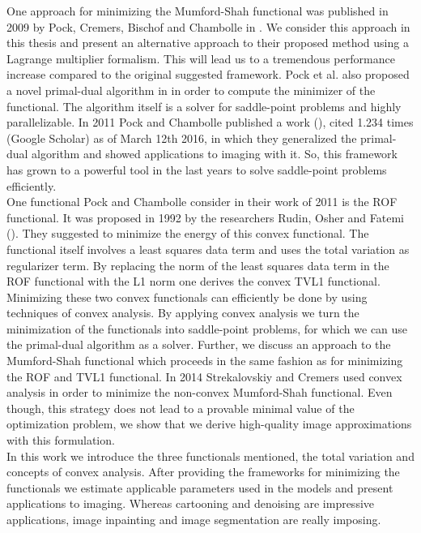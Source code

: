 \documentclass[abstracton]{scrreprt}
\begin{document}
    One approach for minimizing the Mumford-Shah functional was published in 2009 by Pock, Cremers, Bischof and Chambolle in \cite{Pock-et-al-iccv09}. We consider this approach in this thesis and present an alternative approach to their proposed method using a Lagrange multiplier formalism. This will lead us to a tremendous performance increase compared to the original suggested framework. Pock et al. also proposed a novel primal-dual algorithm in \cite{Pock-et-al-iccv09} in order to compute the minimizer of the functional. The algorithm itself is a solver for saddle-point problems and highly parallelizable. In 2011 Pock and Chambolle published a work (\cite{Chambolle10afirst-order}), cited 1.234 times (Google Scholar) as of March 12th 2016, in which they generalized the primal-dual algorithm and showed applications to imaging with it. So, this framework has grown to a powerful tool in the last years to solve saddle-point problems efficiently.\\
    One functional Pock and Chambolle consider in their work of 2011 is the ROF functional. It was proposed in 1992 by the researchers Rudin, Osher and Fatemi (\cite{ROF}). They suggested to minimize the energy of this convex functional. The functional itself involves a least squares data term and uses the total variation as regularizer term. By replacing the norm of the least squares data term in the ROF functional with the L1 norm one derives the convex TVL1 functional. Minimizing these two convex functionals can efficiently be done by using techniques of convex analysis. By applying convex analysis we turn the minimization of the functionals into saddle-point problems, for which we can use the primal-dual algorithm as a solver. Further, we discuss an approach to the Mumford-Shah functional which proceeds in the same fashion as for minimizing the ROF and TVL1 functional. In 2014 Strekalovskiy and Cremers used convex analysis in order to minimize the non-convex Mumford-Shah functional. Even though, this strategy does not lead to a provable minimal value of the optimization problem, we show that we derive high-quality image approximations with this formulation.\\
    In this work we introduce the three functionals mentioned, the total variation and concepts of convex analysis. After providing the frameworks for minimizing the functionals we estimate applicable parameters used in the models and present applications to imaging. Whereas cartooning and denoising are impressive applications, image inpainting and image segmentation are really imposing.
\end{document}
